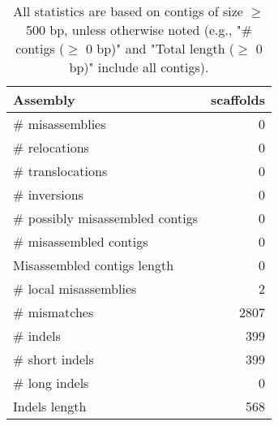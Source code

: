 \documentclass[12pt,a4paper]{article}
\begin{document}
\begin{table}[ht]
\begin{center}
\caption{All statistics are based on contigs of size $\geq$ 500 bp, unless otherwise noted (e.g., "\# contigs ($\geq$ 0 bp)" and "Total length ($\geq$ 0 bp)" include all contigs).}
\begin{tabular}{|l*{1}{|r}|}
\hline
Assembly & scaffolds \\ \hline
\# misassemblies & 0 \\ \hline
\hspace{5mm}\# relocations & 0 \\ \hline
\hspace{5mm}\# translocations & 0 \\ \hline
\hspace{5mm}\# inversions & 0 \\ \hline
\# possibly misassembled contigs & 0 \\ \hline
\# misassembled contigs & 0 \\ \hline
Misassembled contigs length & 0 \\ \hline
\# local misassemblies & 2 \\ \hline
\# mismatches & 2807 \\ \hline
\# indels & 399 \\ \hline
\hspace{5mm}\# short indels & 399 \\ \hline
\hspace{5mm}\# long indels & 0 \\ \hline
Indels length & 568 \\ \hline
\end{tabular}
\end{center}
\end{table}
\end{document}
